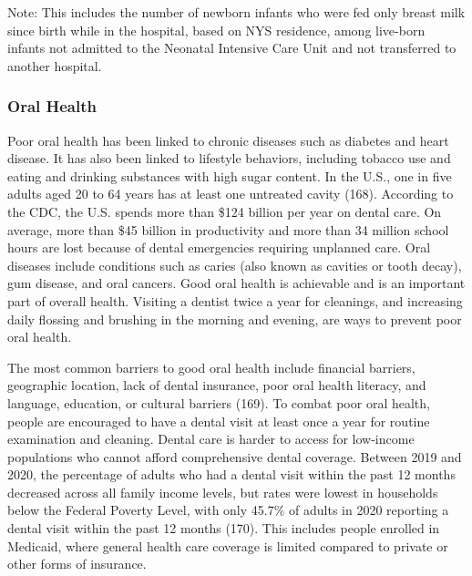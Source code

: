 \documentclass[
  english,
  letterpaper,
]{report}
\begin{document}
\begin{tcolorbox}[enhanced jigsaw, breakable, leftrule=.75mm, title=\textcolor{quarto-callout-note-color}{\faInfo}\hspace{0.5em}{Note}, bottomrule=.15mm, opacityback=0, left=2mm, colback=white, bottomtitle=1mm, coltitle=black, colbacktitle=quarto-callout-note-color!10!white, colframe=quarto-callout-note-color-frame, opacitybacktitle=0.6, toptitle=1mm, titlerule=0mm, arc=.35mm, rightrule=.15mm, toprule=.15mm]

Note: This includes the number of newborn infants who were fed only
breast milk since birth while in the hospital, based on NYS residence,
among live-born infants not admitted to the Neonatal Intensive Care Unit
and not transferred to another hospital.

\end{tcolorbox}

\subsubsection{Oral Health}\label{oral-health}

Poor oral health has been linked to chronic diseases such as diabetes
and heart disease. It has also been linked to lifestyle behaviors,
including tobacco use and eating and drinking substances with high sugar
content. In the U.S., one in five adults aged 20 to 64 years has at
least one untreated cavity (168). According to the CDC, the U.S. spends
more than \$124 billion per year on dental care. On average, more than
\$45 billion in productivity and more than 34 million school hours are
lost because of dental emergencies requiring unplanned care. Oral
diseases include conditions such as caries (also known as cavities or
tooth decay), gum disease, and oral cancers. Good oral health is
achievable and is an important part of overall health. Visiting a
dentist twice a year for cleanings, and increasing daily flossing and
brushing in the morning and evening, are ways to prevent poor oral
health.

The most common barriers to good oral health include financial barriers,
geographic location, lack of dental insurance, poor oral health
literacy, and language, education, or cultural barriers (169). To combat
poor oral health, people are encouraged to have a dental visit at least
once a year for routine examination and cleaning. Dental care is harder
to access for low-income populations who cannot afford comprehensive
dental coverage. Between 2019 and 2020, the percentage of adults who had
a dental visit within the past 12 months decreased across all family
income levels, but rates were lowest in households below the Federal
Poverty Level, with only 45.7\% of adults in 2020 reporting a dental
visit within the past 12 months (170). This includes people enrolled in
Medicaid, where general health care coverage is limited compared to
private or other forms of insurance.
\end{document}
